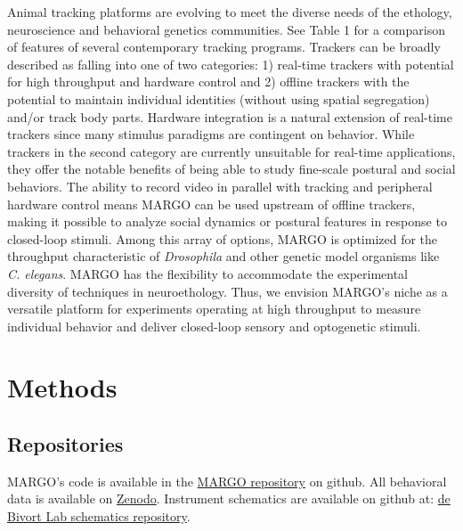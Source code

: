 \documentclass[12pt,letterpaper]{article}
\begin{document}
Animal tracking platforms are evolving to meet the diverse needs of the ethology, neuroscience and behavioral genetics communities. See Table 1 for a comparison of features of several contemporary tracking programs. Trackers can be broadly described as falling into one of two categories: 1) real-time trackers \cite{Fry_TrackFly_2008,Straw_Multi_2010,Chagas_The_2017,Geissmann_Ethoscopes_2017,Mnck_BioTracker_2018,Scaplen_Automated_2019} with potential for high throughput and hardware control and 2) offline trackers \cite{Branson_High_2009,Prez-Escudero_idTracker_2014,Eyjolfsdottir_Detecting_2014,Rodriguez_ToxId_2017,Sridhar_2019,romero-ferrero_2019} with the potential to maintain individual identities (without using spatial segregation) and/or track body parts. Hardware integration is a natural extension of real-time trackers since many stimulus paradigms are contingent on behavior. While trackers in the second category are currently unsuitable for real-time applications, they offer the notable benefits of being able to study fine-scale postural and social behaviors. The ability to record video in parallel with tracking and peripheral hardware control means MARGO can be used upstream of offline trackers, making it possible to analyze social dynamics or postural features in response to closed-loop stimuli. Among this array of options, MARGO is optimized for the throughput characteristic of \textit{Drosophila} and other genetic model organisms like \textit{C. elegans}. MARGO has the flexibility to accommodate the experimental diversity of techniques in neuroethology. Thus, we envision MARGO's niche as a versatile platform for experiments operating at high throughput to measure individual behavior and deliver closed-loop sensory and optogenetic stimuli.

\section*{Methods}

 \subsection*{Repositories}
MARGO's code is available in the \href{https://github.com/de-Bivort-Lab/margo}{MARGO repository} on github. All behavioral data is available on \href{https://zenodo.org/record/2596143#.XI2maRNKiRc}{Zenodo}. Instrument schematics are available on github at: \href{https://github.com/de-Bivort-Lab/dblab-schematics}{de Bivort Lab schematics repository}.
\end{document}
